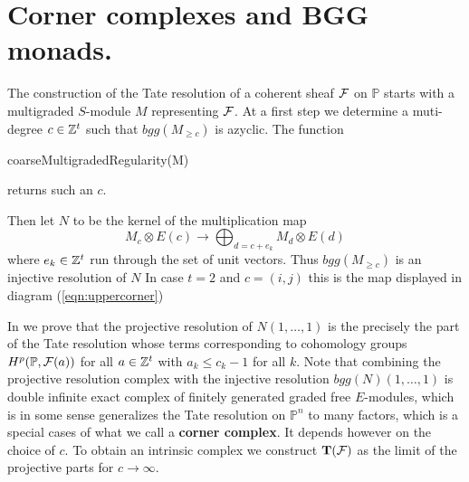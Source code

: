 \documentclass[twoside,12pt, leqno]{amsart}
\def\PP{{\mathbb P}}
\def\bT{{\bf T}}
\begin{document}
\section{Corner complexes and BGG monads.}\label{sec:corner complex}

The construction of the Tate resolution of a coherent sheaf ${\mathcal F}$ on $\PP$ starts with a multigraded $S$-module $M$ representing ${\mathcal F}$. At a first step we determine a muti-degree $c \in {\mathbb Z}^t$ such that $bgg(M_{ \ge c})$ is azyclic.
The function \begin{verb} coarseMultigradedRegularity(M) \end{verb} returns such an $c$.

Then let $N$ to be the kernel of the multiplication map
$$ M_c \otimes E(c) \to \bigoplus_{d=c+e_k}M_{d} \otimes E(d) $$
where $e_k \in {\mathbb Z}^t$ run through the set of unit vectors. 
Thus $bgg(M_{\ge c})$ is an injective resolution of $N$
In case $t=2$ and $c=(i,j)$ this is the map displayed in diagram (\ref{eqn:uppercorner})
 
In \cite{EES} we prove that
the projective resolution of $N(1,\ldots,1)$ is the precisely the part of the Tate resolution whose terms corresponding to cohomology groups
$H^p(\PP, \sF(a))$ for all $a \in {\mathbb Z}^t$ with $a_k\le c_k -1$ for all $k$. 
Note that combining the projective resolution  complex 
 with the injective resolution $bgg(N)(1,\ldots,1)$  is double infinite exact complex of finitely generated graded free $E$-modules,
which is in some sense generalizes  the Tate resolution on $\PP^n$ to many factors, which is a special cases of what we call a {\bf corner complex}. 
It depends however on the choice of $c$. To obtain an intrinsic
complex we construct $\bT(\sF)$
as the limit of the projective parts for $c \to \infty$.
\end{document}
